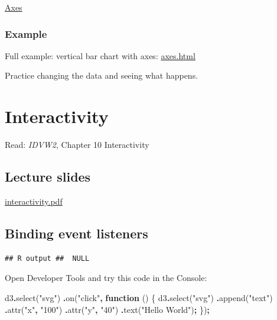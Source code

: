 \documentclass[
  openany]{book}
\newenvironment{Shaded}{\begin{snugshade}}{\end{snugshade}}
\newcommand{\FunctionTok}[1]{\textcolor[rgb]{0.00,0.00,0.00}{#1}}
\newcommand{\KeywordTok}[1]{\textcolor[rgb]{0.13,0.29,0.53}{\textbf{#1}}}
\newcommand{\NormalTok}[1]{#1}
\newcommand{\OperatorTok}[1]{\textcolor[rgb]{0.81,0.36,0.00}{\textbf{#1}}}
\newcommand{\StringTok}[1]{\textcolor[rgb]{0.31,0.60,0.02}{#1}}
\begin{document}
\href{pdfs/axes.pdf}{Axes}

\hypertarget{example-1}{%
\subsection{Example}\label{example-1}}

Full example: vertical bar chart with axes: \href{code/axes.html}{axes.html}

Practice changing the data and seeing what happens.

\hypertarget{interactivity}{%
\chapter{\texorpdfstring{Interactivity }{Interactivity }}\label{interactivity}}

Read: \emph{IDVW2}, Chapter 10 Interactivity

\hypertarget{lecture-slides-4}{%
\section{\texorpdfstring{Lecture slides }{Lecture slides }}\label{lecture-slides-4}}

\href{pdfs/interactivity.pdf}{interactivity.pdf}

\hypertarget{binding-event-listeners}{%
\section{Binding event listeners}\label{binding-event-listeners}}

\begin{verbatim}
## R output ##  NULL
\end{verbatim}

Open Developer Tools and try this code in the Console:

\begin{Shaded}
\begin{Highlighting}[]
\NormalTok{d3}\OperatorTok{.}\FunctionTok{select}\NormalTok{(}\StringTok{"svg"}\NormalTok{)}
  \OperatorTok{.}\FunctionTok{on}\NormalTok{(}\StringTok{"click"}\OperatorTok{,} \KeywordTok{function}\NormalTok{ () \{}
\NormalTok{    d3}\OperatorTok{.}\FunctionTok{select}\NormalTok{(}\StringTok{"svg"}\NormalTok{)}
      \OperatorTok{.}\FunctionTok{append}\NormalTok{(}\StringTok{"text"}\NormalTok{)}
        \OperatorTok{.}\FunctionTok{attr}\NormalTok{(}\StringTok{"x"}\OperatorTok{,} \StringTok{"100"}\NormalTok{)}
        \OperatorTok{.}\FunctionTok{attr}\NormalTok{(}\StringTok{"y"}\OperatorTok{,} \StringTok{"40"}\NormalTok{)}
        \OperatorTok{.}\FunctionTok{text}\NormalTok{(}\StringTok{"Hello World"}\NormalTok{)}\OperatorTok{;}
\NormalTok{        \})}\OperatorTok{;}
\end{Highlighting}
\end{Shaded}
\end{document}
